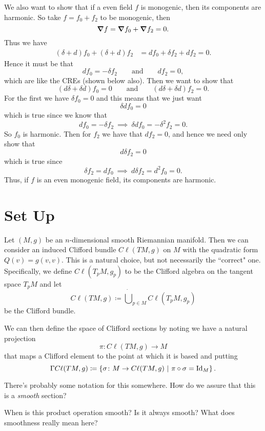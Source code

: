 We also want to show that if a even field $f$ is monogenic, then its components are harmonic. So take $f=f_0+f_2$ to be monogenic, then
\[
\boldsymbol{\nabla} f = \boldsymbol{\nabla} f_0 + \boldsymbol{\nabla} f_2 = 0.
\]
Thus we have
\begin{align*}
    (\delta + d)f_0 + (\delta+d)f_2&= df_0 + \delta f_2 + df_2 = 0. 
\end{align*}
Hence it must be that 
\[
df_0 = - \delta f_2 \qquad \textrm{and} \qquad df_2 = 0,
\]
which are like the CREs (shown below also).  Then we want to show that
\[
(d\delta +\delta d)f_0 = 0 \qquad \textrm{and} \qquad (d\delta + \delta d) f_2 = 0.
\]
For the first we have $\delta f_0=0$ and this means that we just want
\[
\delta d f_0 =0 
\]
which is true since we know that 
\[
df_0 = -\delta f_2 ~\implies~ \delta df_0 = -\delta^2 f_2 = 0.
\]
So $f_0$ is harmonic.  Then for $f_2$ we have that $df_2=0$, and hence we need only show that
\[
d\delta f_2 =0
\]
which is true since
\[
\delta f_2 = df_0 ~\implies~ d\delta f_2 = d^2 f_0 = 0.
\]
Thus, if $f$ is an even monogenic field, its components are harmonic.



\section{Set Up}
Let $(M,g)$ be an $n$-dimensional smooth Riemannian manifold.  Then we can consider an induced Clifford bundle $C\ell(TM,g)$ on $M$ with the quadratic form $Q(v)=g(v,v)$.  This is a natural choice, but not necessarily the ``correct" one.  Specifically, we define $C\ell(T_pM,g_p)$ to be the Clifford algebra on the tangent space $T_pM$ and let
\[
C\ell(TM,g) \coloneqq \dot{\bigcup}_{p\in M} C\ell (T_pM,g_p)
\]
be the Clifford bundle.

We can then define the space of Clifford sections by noting we have a natural projection
\[
\pi \colon C\ell(TM,g) \to M
\]
that maps a Clifford element to the point at which it is based and putting
\[
\Gamma C \ell (TM,g) \coloneqq \left\{ \sigma \colon M \to C\ell(TM,g) ~\vert~ \pi \circ \sigma = \mathrm{Id}_M\right\}.
\]
\begin{question}
There's probably some notation for this somewhere. How do we assure that this is a \emph{smooth} section?
\end{question}

\begin{question}
When is this product operation smooth? Is it always smooth? What does smoothness really mean here?
\end{question}

